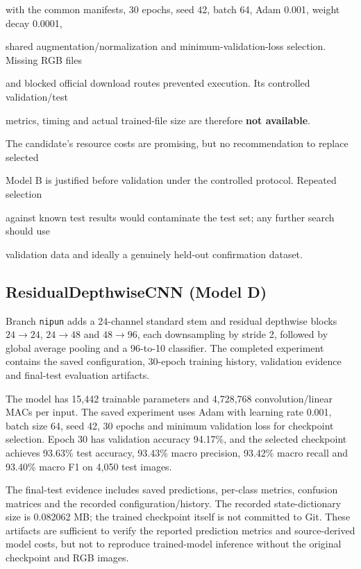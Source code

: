 \documentclass[11pt,a4paper]{article}
\DeclareRobustCommand{\code}[1]{\nolinkurl{#1}}
\begin{document}
with the common manifests, 30 epochs, seed 42, batch 64, Adam 0.001, weight decay 0.0001,

shared augmentation/normalization and minimum-validation-loss selection. Missing RGB files

and blocked official download routes prevented execution. Its controlled validation/test

metrics, timing and actual trained-file size are therefore \textbf{not available}.



The candidate's resource costs are promising, but no recommendation to replace selected

Model B is justified before validation under the controlled protocol. Repeated selection

against known test results would contaminate the test set; any further search should use

validation data and ideally a genuinely held-out confirmation dataset.



\subsection{ResidualDepthwiseCNN (Model D)}

Branch \code{nipun} adds a 24-channel standard stem and residual depthwise blocks
$24\to24$, $24\to48$ and $48\to96$, each downsampling by stride 2, followed by global
average pooling and a 96-to-10 classifier. The completed experiment contains the saved
configuration, 30-epoch training history, validation evidence and final-test evaluation
artifacts.

The model has 15,442 trainable parameters and 4,728,768 convolution/linear MACs per
input. The saved experiment uses Adam with learning rate 0.001, batch size 64, seed 42,
30 epochs and minimum validation loss for checkpoint selection. Epoch 30 has validation
accuracy 94.17\%, and the selected checkpoint achieves 93.63\% test accuracy, 93.43\%
macro precision, 93.42\% macro recall and 93.40\% macro F1 on 4,050 test images.

The final-test evidence includes saved predictions, per-class metrics, confusion matrices
and the recorded configuration/history. The recorded state-dictionary size is 0.082062 MB;
the trained checkpoint itself is not committed to Git. These artifacts are sufficient to
verify the reported prediction metrics and source-derived model costs, but not to reproduce
trained-model inference without the original checkpoint and RGB images.
\end{document}
